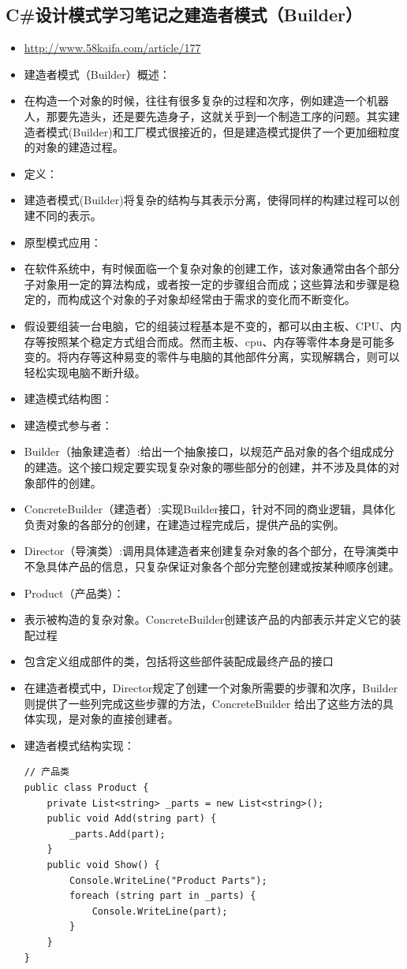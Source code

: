 \documentclass[9pt, b5paper]{article}
\begin{document}
\subsection{C\#设计模式学习笔记之建造者模式（Builder）}
\label{sec:orgfebcb63}
\begin{itemize}
\item \url{http://www.58kaifa.com/article/177}
\item 建造者模式（Builder）概述：
\item 在构造一个对象的时候，往往有很多复杂的过程和次序，例如建造一个机器人，那要先造头，还是要先造身子，这就关乎到一个制造工序的问题。其实建造者模式(Builder)和工厂模式很接近的，但是建造模式提供了一个更加细粒度的对象的建造过程。
\item 定义：
\item 建造者模式(Builder)将复杂的结构与其表示分离，使得同样的构建过程可以创建不同的表示。
\item 原型模式应用：
\item 在软件系统中，有时候面临一个复杂对象的创建工作，该对象通常由各个部分子对象用一定的算法构成，或者按一定的步骤组合而成；这些算法和步骤是稳定的，而构成这个对象的子对象却经常由于需求的变化而不断变化。
\item 假设要组装一台电脑，它的组装过程基本是不变的，都可以由主板、CPU、内存等按照某个稳定方式组合而成。然而主板、cpu、内存等零件本身是可能多变的。将内存等这种易变的零件与电脑的其他部件分离，实现解耦合，则可以轻松实现电脑不断升级。
\item 建造模式结构图：
\item 建造模式参与者：
\item Builder（抽象建造者）:给出一个抽象接口，以规范产品对象的各个组成成分的建造。这个接口规定要实现复杂对象的哪些部分的创建，并不涉及具体的对象部件的创建。
\item ConcreteBuilder（建造者）:实现Builder接口，针对不同的商业逻辑，具体化负责对象的各部分的创建，在建造过程完成后，提供产品的实例。
\item Director（导演类）:调用具体建造者来创建复杂对象的各个部分，在导演类中不急具体产品的信息，只复杂保证对象各个部分完整创建或按某种顺序创建。
\item Product（产品类）：
\item 表示被构造的复杂对象。ConcreteBuilder创建该产品的内部表示并定义它的装配过程
\item 包含定义组成部件的类，包括将这些部件装配成最终产品的接口
\item 在建造者模式中，Director规定了创建一个对象所需要的步骤和次序，Builder则提供了一些列完成这些步骤的方法，ConcreteBuilder 给出了这些方法的具体实现，是对象的直接创建者。
\item 建造者模式结构实现：
\begin{verbatim}
// 产品类
public class Product {
    private List<string> _parts = new List<string>();
    public void Add(string part) {
        _parts.Add(part);
    }
    public void Show() {
        Console.WriteLine("Product Parts");
        foreach (string part in _parts) {
            Console.WriteLine(part);
        }
    }
}
 

\end{verbatim}
\end{itemize}
\end{document}
